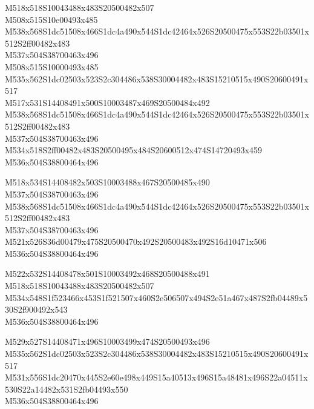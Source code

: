 \documentclass{article}
\begin{document}
\begin{multicols}{5}
\begin{center}
M518x518S10043488x483S20500482x507 %
\\M508x515S10e00493x485 %
\\M538x568S1dc51508x466S1dc4a490x544S1dc42464x526S20500475x553S22b03501x512S2ff00482x483 %
\\M537x504S38700463x496 %
\\M508x515S10000493x485 %
\\M535x562S1dc02503x523S2c304486x538S30004482x483S15210515x490S20600491x517 %
\\M517x531S14408491x500S10003487x469S20500484x492 %
\\M538x568S1dc51508x466S1dc4a490x544S1dc42464x526S20500475x553S22b03501x512S2ff00482x483 %
\\M537x504S38700463x496 %
\\M534x518S2ff00482x483S20500495x484S20600512x474S14720493x459 %
\\M536x504S38800464x496 %

M518x534S14408482x503S10003488x467S20500485x490 %
\\M537x504S38700463x496 %
\\M538x568S1dc51508x466S1dc4a490x544S1dc42464x526S20500475x553S22b03501x512S2ff00482x483 %
\\M537x504S38700463x496 %
\\M521x526S36d00479x475S20500470x492S20500483x492S16d10471x506 %
\\M536x504S38800464x496 %

M522x532S14408478x501S10003492x468S20500488x491 %
\\M518x518S10043488x483S20500482x507 %
\\M534x548S1f523466x453S1f521507x460S2e506507x494S2e51a467x487S2fb04489x530S2f900492x543 %
\\M536x504S38800464x496 %

M529x527S14408471x496S10003499x474S20500493x496 %
\\M535x562S1dc02503x523S2c304486x538S30004482x483S15210515x490S20600491x517 %
\\M531x556S1dc20470x445S2e60e498x449S15a40513x496S15a48481x496S22a04511x530S22a14482x531S2fb04493x550 %
\\M536x504S38800464x496 %

\end{center}
\end{multicols}
\end{document}

